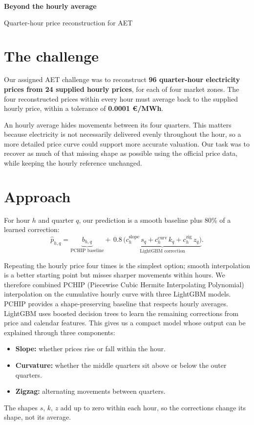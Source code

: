 \documentclass[10pt,a4paper]{article}
\begin{document}
{\LARGE\bfseries\color{ink} Beyond the hourly average}\par
{\large Quarter-hour price reconstruction for AET}
\vspace{0pt}

\section{The challenge}
Our assigned AET challenge was to reconstruct \textbf{96 quarter-hour electricity prices from 24 supplied hourly prices}, for each of four market zones. The four reconstructed prices within every hour must average back to the supplied hourly price, within a tolerance of \textbf{0.0001 \euro{}/MWh}.

An hourly average hides movements between its four quarters. This matters because electricity is not necessarily delivered evenly throughout the hour, so a more detailed price curve could support more accurate valuation. Our task was to recover as much of that missing shape as possible using the official price data, while keeping the hourly reference unchanged.

\section{Approach}
For hour $h$ and quarter $q$, our prediction is a smooth baseline plus 80\% of a learned correction:
{\setlength{\abovedisplayskip}{1pt}\setlength{\belowdisplayskip}{0pt}\[
\hat p_{h,q} = \underbrace{b_{h,q}}_{\text{PCHIP baseline}} + \, 0.8\,\underbrace{\big(c^{\mathrm{slope}}_{h}\,s_q + c^{\mathrm{curv}}_{h}\,k_q + c^{\mathrm{zig}}_{h}\,z_q\big)}_{\text{LightGBM correction}}.
\]}

Repeating the hourly price four times is the simplest option; smooth interpolation is a better starting point but misses sharper movements within hours. We therefore combined PCHIP (Piecewise Cubic Hermite Interpolating Polynomial) interpolation on the cumulative hourly curve with three LightGBM models. PCHIP provides a shape-preserving baseline that respects hourly averages. LightGBM uses boosted decision trees to learn the remaining corrections from price and calendar features. This gives us a compact model whose output can be explained through three components:
\begin{itemize}
\item \textbf{Slope:} whether prices rise or fall within the hour.
\item \textbf{Curvature:} whether the middle quarters sit above or below the outer quarters.
\item \textbf{Zigzag:} alternating movements between quarters.
\end{itemize}
The shapes $s$, $k$, $z$ add up to zero within each hour, so the corrections change its shape, not its average.
\end{document}
